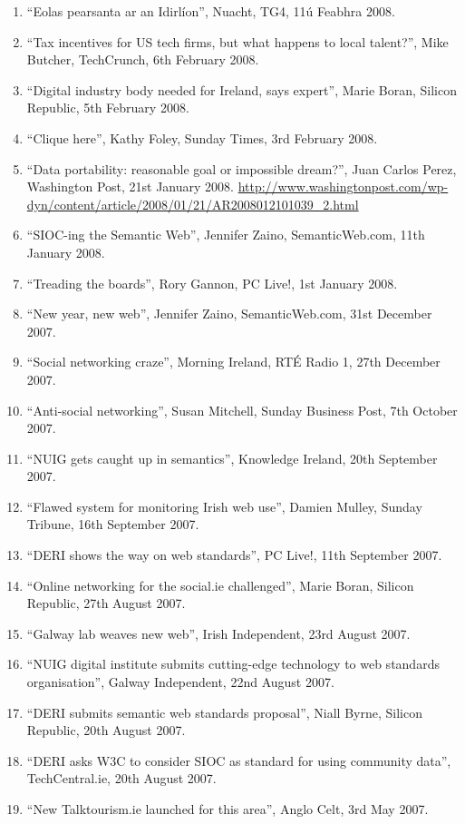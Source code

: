 \documentclass[10pt,a4paper]{res} %
\begin{document}
\begin{resume}
{\begin{enumerate}
\item ``Eolas pearsanta ar an Idirl\'{i}on'', Nuacht, TG4, 11\'{u} Feabhra 2008.
\item ``Tax incentives for US tech firms, but what happens to local talent?'', Mike Butcher, TechCrunch, 6th February 2008.
\item ``Digital industry body needed for Ireland, says expert'', Marie Boran, Silicon Republic, 5th February 2008.
\item ``Clique here'', Kathy Foley, Sunday Times, 3rd February 2008.
\item ``Data portability: reasonable goal or impossible dream?'', Juan Carlos Perez, Washington Post, 21st January 2008. \url{http://www.washingtonpost.com/wp-dyn/content/article/2008/01/21/AR2008012101039_2.html}
\item ``SIOC-ing the Semantic Web'', Jennifer Zaino, SemanticWeb.com, 11th January 2008.
\item ``Treading the boards'', Rory Gannon, PC Live!, 1st January 2008.
\item ``New year, new web'', Jennifer Zaino, SemanticWeb.com, 31st December 2007.
\item ``Social networking craze'', Morning Ireland, RT\'{E} Radio 1, 27th December 2007.
\item ``Anti-social networking'', Susan Mitchell, Sunday Business Post, 7th October 2007.
\item ``NUIG gets caught up in semantics'', Knowledge Ireland, 20th September 2007.
\item ``Flawed system for monitoring Irish web use'', Damien Mulley, Sunday Tribune, 16th September 2007.
\item ``DERI shows the way on web standards'', PC Live!, 11th September 2007.
\item ``Online networking for the social.ie challenged'', Marie Boran, Silicon Republic, 27th August 2007.
\item ``Galway lab weaves new web'', Irish Independent, 23rd August 2007.
\item ``NUIG digital institute submits cutting-edge technology to web standards organisation'', Galway Independent, 22nd August 2007.
\item ``DERI submits semantic web standards proposal'', Niall Byrne, Silicon Republic, 20th August 2007.
\item ``DERI asks W3C to consider SIOC as standard for using community data'', TechCentral.ie, 20th August 2007.
\item ``New Talktourism.ie launched for this area'', Anglo Celt, 3rd May 2007.

\end{enumerate}}
\end{resume}
\end{document}
